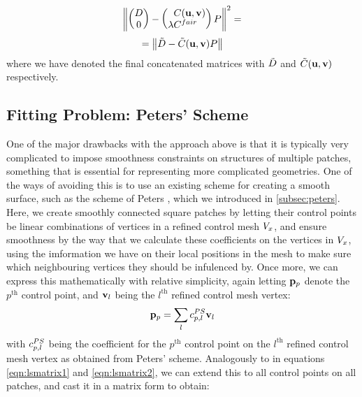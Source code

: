 \begin{equation*}
\norm{
\begin{pmatrix}
\lsDataPointMatrix \\ 0
\end{pmatrix} -
\begin{pmatrix*}[l]
\phantom{\lambda}\lsControlPointCoefMatrix(\vec{u},\vec{v}) \\ \lambda \lsControlPointCoefMatrix^{fair}
\end{pmatrix*}
\lsControlPointMatrix 
}^2 =
\end{equation*}
\begin{equation}
\label{eq:lsconcatmat}
= \norm{\lsDataPointConcMatrix - \lsControlCoefConcMatrix(\vec{u},\vec{v}) \lsControlPointMatrix }
\end{equation}
where we have denoted the final concatenated matrices with $\lsDataPointConcMatrix$ and $ \lsControlCoefConcMatrix(\vec{u},\vec{v})$ respectively.

\subsection{Fitting Problem: Peters' Scheme}
\label{subsub:petersleastsq}
One of the major drawbacks with the approach above is that it is typically very complicated to impose smoothness constraints on structures of multiple patches, something that is essential for representing more complicated geometries. One of the ways of avoiding this is to use an existing scheme for creating a smooth surface, such as the scheme of Peters \cite{peters1992constructing,eck1996automatic}, which we introduced in \autoref{subsec:peters}. Here, we create smoothly connected square \Bez patches by letting their control points be linear combinations of vertices in a refined control mesh $\petersPatchPoints$, and ensure smoothness by the way that we calculate these coefficients on the vertices in $\petersPatchPoints$, using the imformation we have on their local positions in the mesh to make sure which neighbouring vertices they should be infulenced by. Once more, we can express this mathematically with relative simplicity, again letting $\lsControlPointi{p}$ denote the $p^\text{th}$ control point, and $\petersPatchPointVec_l$ being the $l^\text{th}$ refined control mesh vertex:
\begin{equation}
\lsControlPointi{p} = \sum\limits_{l} \petersControlPointCoef_{p,l} \petersPatchPointVec_l
\end{equation} 
with $\petersControlPointCoef_{p,l}$ being the coefficient for the $p^\text{th}$ \Bez control point on the $l^\text{th}$ refined control mesh vertex as obtained from Peters' scheme. Analogously to in equations \ref{eqn:lsmatrix1} and \ref{eqn:lsmatrix2}, we can extend this to all \Bez control points on all patches, and cast it in a matrix form to obtain:

